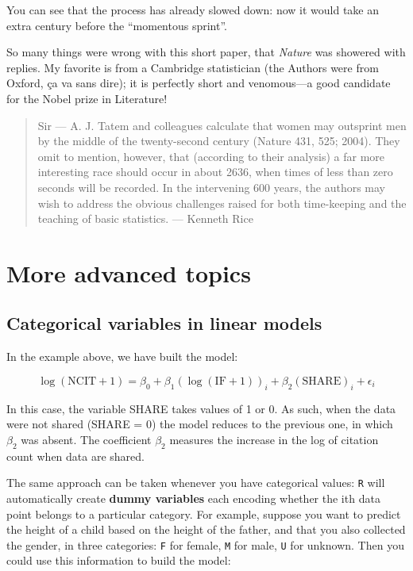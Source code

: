 \documentclass[
  letterpaper,
  DIV=11,
  numbers=noendperiod]{scrreprt}
\begin{document}
You can see that the process has already slowed down: now it would take
an extra century before the ``momentous sprint''.

So many things were wrong with this short paper, that \emph{Nature} was
showered with replies. My favorite is from a Cambridge statistician (the
Authors were from Oxford, ça va sans dire); it is perfectly short and
venomous---a good candidate for the Nobel prize in Literature!

\begin{quote}
Sir --- A. J. Tatem and colleagues calculate that women may outsprint
men by the middle of the twenty-second century (Nature 431, 525; 2004).
They omit to mention, however, that (according to their analysis) a far
more interesting race should occur in about 2636, when times of less
than zero seconds will be recorded. In the intervening 600 years, the
authors may wish to address the obvious challenges raised for both
time-keeping and the teaching of basic statistics. --- Kenneth Rice
\end{quote}

\hypertarget{more-advanced-topics}{%
\section{More advanced topics}\label{more-advanced-topics}}

\hypertarget{categorical-variables-in-linear-models}{%
\subsection{Categorical variables in linear
models}\label{categorical-variables-in-linear-models}}

In the example above, we have built the model:

\[
 \log(\text{NCIT} + 1) = \beta_0 + \beta_1 (\log(\text{IF} + 1))_i + \beta_2 (\text{SHARE})_i + \epsilon_i
\]

In this case, the variable SHARE takes values of 1 or 0. As such, when
the data were not shared (SHARE = 0) the model reduces to the previous
one, in which \(\beta_2\) was absent. The coefficient \(\beta_2\)
measures the increase in the log of citation count when data are shared.

The same approach can be taken whenever you have categorical values:
\texttt{R} will automatically create \textbf{dummy variables} each
encoding whether the ith data point belongs to a particular category.
For example, suppose you want to predict the height of a child based on
the height of the father, and that you also collected the gender, in
three categories: \texttt{F} for female, \texttt{M} for male, \texttt{U}
for unknown. Then you could use this information to build the model:
\end{document}
